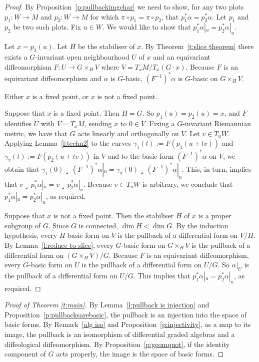\documentclass[pdftex]{sigma}
\numberwithin{equation}{section}
\newcommand{\hook}{{\lrcorner\,}} %
\newcommand{\hypref}[2]{{#2~\ref{#1}}}
\begin{document}
\begin{proof}
By \hypref{p:pullbackimgchar}{Proposition} we need to show,
for any two plots $p_1 \colon W \to M$
and $p_2 \colon W\to M$ for which $\pi \circ p_1 = \pi \circ p_2$,
that $p_1^* \alpha = p_2^* \alpha$.
Let $p_1$ and $p_2$ be two such plots.
Fix $u\in W$. We would like to show that $p_1^*\alpha|_u = p_2^*\alpha|_u$.

Let $x = p_2(u)$. Let $H$ be the stabiliser of $x$.
By Theorem~\ref{t:slice theorem} %
there exists
a $G$-invariant open neighbourhood $U$ of $x$ and an equivariant
dif\/feomorphism $F \colon U \to G \times_H V$
where $V = T_xM / T_x(G \cdot x)$.
Because $F$ is an equivariant dif\/feomorphism and $\alpha$ is $G$-basic,
$(F^{-1})^* \alpha$ is $G$-basic on $G \times_H V$.

Either $x$ is a f\/ixed point, or $x$ is not a f\/ixed point.

Suppose that $x$ is a f\/ixed point. Then $H=G$.
So $p_1(u) = p_2(u) = x$, and $F$ identif\/ies $U$ with $V = T_xM$,
sending $x$ to $0 \in V$.
Fixing a $G$-invariant Riemannian metric, we have
that $G$ acts linearly and orthogonally on $V$. Let $v \in T_uW$. Applying \hypref{l:techn2}{Lemma} to the curves
$\gamma_1(t) := F(p_1(u+tv))$ and $\gamma_2(t) := F(p_2(u+tv))$ in $V$
and to the basic form $(F^{-1})^*\alpha$ on $V$,
we obtain that $\dot{\gamma}_1(0) \hook (F^{-1})^*\alpha|_0
 = \dot{\gamma}_2(0) \hook (F^{-1})^*\alpha|_0$.
This, in turn, implies that $v \hook p_1^*\alpha|_u = v \hook p_2^* \alpha|_u$.
Because $v \in T_uW$ is arbitrary, we conclude
that $p_1^*\alpha|_u = p_2^*\alpha|_u$, as required.

Suppose that $x$ is not a f\/ixed point.
Then the stabiliser $H$ of $x$ is a proper subgroup of $G$.
Since $G$ is connected, $\dim H < \dim G$.
By the induction hypothesis, every $H$-basic form on $V$
is the pullback of a dif\/ferential form on $V/H$.
By \hypref{l:reduce to slice}{Lemma},
every $G$-basic form on $G \times_H V$
is the pullback of a dif\/ferential form on $(G \times_H V)/G$.
Because $F$ is an equivariant dif\/feomorphism,
every $G$-basic form on $U$
is the pullback of a dif\/ferential form on $U/G$.
So $\alpha|_U$ is the pullback of a dif\/ferential form on $U/G$.
This implies that $p_1^* \alpha|_u = p_2^* \alpha|_u$, as required.
\end{proof}

\begin{proof}[Proof of Theorem \ref{t:main}]
By \hypref{l:pullback is injection}{Lemma}
and \hypref{p:pullbacksarebasic}{Proposition},
the pullback is an injection into the space of basic forms.
By \hypref{alg iso}{Remark} and \hypref{p:injectivity}{Proposition},
as a map to its image,
the pullback is an isomorphism of dif\/ferential graded algebras
and a dif\/feological dif\/feomorphism.
By \hypref{p:geomquot}{Proposition}, if the identity component of $G$
acts properly, the image is the space of basic forms.
\end{proof}
\end{document}
